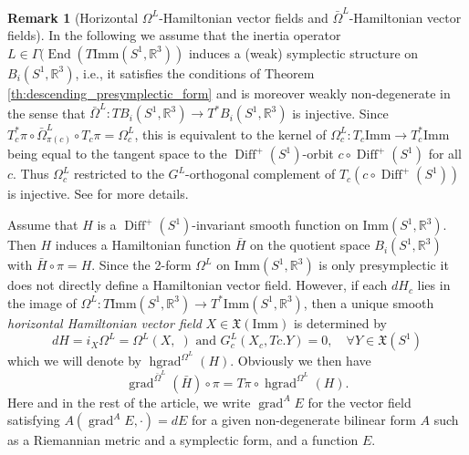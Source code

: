 \documentclass[12pt]{amsart}
\newcommand{\AuthorCOMMENT}[3]{\textcolor{#2}{{[\textbf{#1:} \textsl{#3}}]}}  %
\newcommand{\cMB}[1]{\AuthorCOMMENT{Martin}{blue}{#1}}
\newcommand{\rev}[1]{#1}
\theoremstyle{definition}
\newtheorem{remark}[theorem]{Remark}
\newcommand{\R}{\mathbb R}
\newcommand{\Diffp}{\operatorname{Diff}^+(S^1)}
\newcommand{\Imm}{\mathrm{Imm}}
\def\Om{\Omega}
\def\o{\operatorname{\circ}}
\def\x{\times}
\def\X{{\mathfrak X}}
\def\R{{\mathbb R}}
\let\on=\operatorname
\begin{document}

\begin{remark}[Horizontal $\Om^L$-Hamiltonian vector fields and  $\bar\Om^{L}$-Hamiltonian vector fields]\label{horizontalHamiltonian} 
In the following we assume that the inertia operator $L \in \Gamma(\on{End}(T\Imm(S^1,\mathbb R^3))$ induces a (weak) symplectic structure on $B_i(S^1,\mathbb R^3)$, i.e., it satisfies the conditions of Theorem \ref{th:descending_presymplectic_form}
and is moreover weakly non-degenerate in the sense that $\bar\Om^L: \rev{TB_i(S^1,\R^3) \to T^*B_i(S^1,\R^3) }$ is injective. Since $T_c^*\pi\o \bar\Om^L_{\pi(c)}\o T_c\pi = \Om^L_c$,  this is equivalent to the kernel of $\Om^L_c:T_c\Imm \to T_c^*\Imm$ being equal to the tangent space to the $\Diffp$-orbit $c\o \Diffp$  for all $c$. Thus $\Om^L_c$ restricted to the $G^L$-orthogonal complement of $T_c(c\o\Diffp)$ is injective. See \cite[Section 48]{kriegl_michor_1997convenient} for more details.

Assume that $H$ is a $\Diffp$-invariant smooth function on $\Imm(S^1,\mathbb R^3)$. Then $H$  induces a Hamiltonian function $\bar H$ on the quotient space $B_i(S^1,\mathbb R^3)$ with $\bar H\o\pi = H$.
Since the 2-form $\Om^L$ on $\Imm(S^1,\mathbb R^3)$ is only presymplectic it does not directly define a Hamiltonian vector field. However, if each $dH_c$ lies in the image of $\Om^L:T\Imm(S^1,\mathbb R^3) \to T^*\Imm(S^1,\mathbb R^3)$, then  a unique smooth \emph{horizontal Hamiltonian vector field} $X\in \X(\Imm)$  is determined by 
\begin{equation}\label{eq:horizontal_vector_field}
    dH = i_X\Om^L = \Om^L(X,\;) \text{ and } G^L_c(X_c,Tc.Y)=0,\quad \forall Y\in \X(S^1)
\end{equation}
which we will denote by $\on{hgrad}^{\Om^L}(H)$. Obviously we then have
\begin{equation}
    \on{grad}^{\bar\Om^L}(\bar H)\o \pi = T\pi\o \on{hgrad}^{\Om^L}(H).
\end{equation}
\rev{Here and in the rest of the article, we write $\on{grad}^A E$ for the vector field satisfying $A(\on{grad}^A E,\cdot)=dE$ for a given non-degenerate bilinear form $A$ such as a Riemannian metric and a symplectic form, and a function $E$.}


\end{remark}
\end{document}
